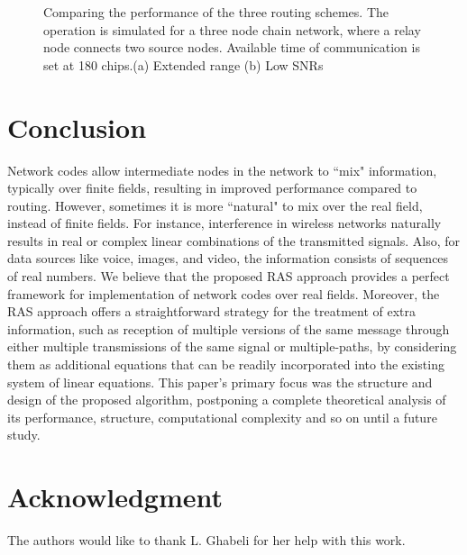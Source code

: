\documentclass[conference]{IEEEtran}
\begin{document}
\begin{figure}[tp]
     \centering

     
\caption{Comparing the performance of the three routing schemes. The operation is simulated for a three node chain network, where a relay node connects two source nodes. Available time of communication is set at 180 chips.(a) Extended range (b) Low SNRs}

\label{fig:digitalAnalogCompare}
\end{figure}

\section{Conclusion}\label{sec:conc}
Network codes allow intermediate nodes in the network to ``mix" information, typically over finite fields, resulting in improved performance compared to routing. However, sometimes it is more ``natural" to mix over the real field, instead of finite fields. For instance, interference in wireless networks naturally results in real or complex linear combinations of the transmitted signals. Also, for data sources like voice, images, and video, the information consists of sequences of real numbers. We believe that the proposed RAS approach provides a perfect framework for implementation of network codes over real fields. Moreover, the RAS approach offers a straightforward strategy for the treatment of extra information, such as reception of multiple versions of the same message through either multiple transmissions of the same signal or multiple-paths, by considering them as additional equations that can be readily incorporated into the existing system of linear equations. This paper's primary focus was the structure and design of the proposed algorithm, postponing a complete theoretical analysis of its performance, structure, computational complexity and so on until a future study.

\section*{Acknowledgment}
The authors would like to thank L. Ghabeli for her help with this work.
\nocite{*}


\end{document}
